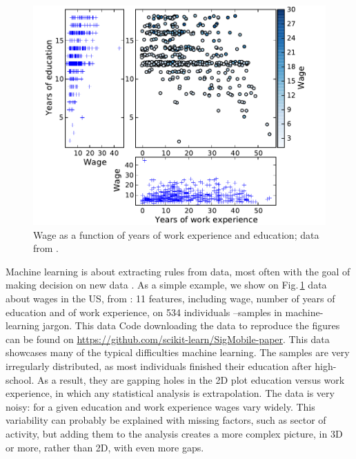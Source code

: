 \documentclass[a4paper]{article}
\begin{document}
\begin{figure}[b]
    \includegraphics[width=1.05\linewidth]{wage_data}%

    \caption{Wage as a function of years of work experience and
    education; data from \cite{berndt1991}\label{fig:data}.}
\end{figure}

Machine learning is about extracting rules from data, most often with the
goal of making decision on new data \cite{elemstatlearn}. As a simple example, we show on
Fig.\,\ref{fig:data} data about wages in the US, from \cite{berndt1991}:
11 features, including wage, number of years of education and of work
experience, on 534 individuals --samples in machine-learning
jargon. This data
Code downloading the data to reproduce the figures can be found on
\url{https://github.com/scikit-learn/SigMobile-paper}.
%
This data showcases many of the typical difficulties machine learning.
The samples are very irregularly distributed, as most individuals
finished their education after high-school. As a result, they are gapping
holes in the 2D plot education versus work experience, in which any
statistical analysis is extrapolation. The data is very noisy: for a
given education and work experience wages vary widely. This variability
can probably be explained with missing factors, such as sector of
activity, but adding them to the analysis creates a more complex picture,
in 3D or more, rather than 2D, with even more gaps.
\end{document}
